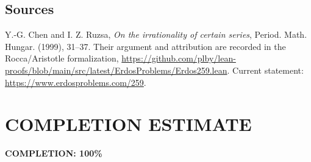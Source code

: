 \subsection{Sources}
Y.-G. Chen and I. Z. Ruzsa, \emph{On the irrationality of certain series}, Period. Math. Hungar. (1999), 31--37. Their argument and attribution are recorded in the Rocca/Aristotle formalization, \url{https://github.com/plby/lean-proofs/blob/main/src/latest/ErdosProblems/Erdos259.lean}. Current statement: \url{https://www.erdosproblems.com/259}.
\section{COMPLETION ESTIMATE}
\textbf{COMPLETION: 100\%}
